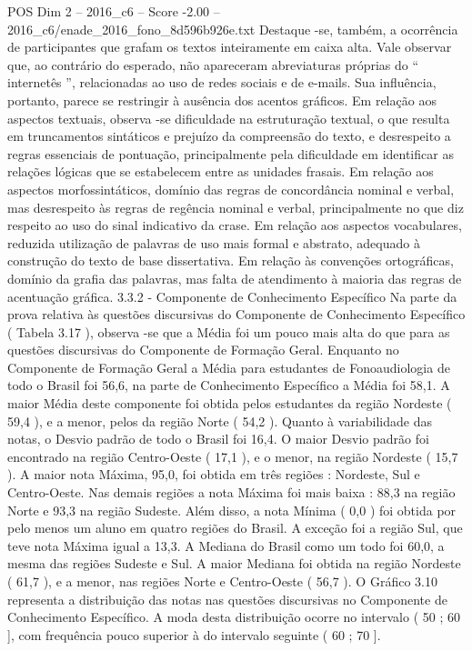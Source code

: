 \begin{textsample}{POS Dim 2 – 2016\_c6 – Score -2.00 – 2016\_c6/enade\_2016\_fono\_8d596b926e.txt}
Destaque -se, também, a ocorrência de participantes que grafam os textos inteiramente em caixa alta.
Vale observar que, ao contrário do esperado, não apareceram abreviaturas próprias do “ internetês ”, relacionadas ao uso de redes sociais e de e-mails.
Sua influência, portanto, parece se restringir à ausência dos acentos gráficos.
Em relação aos aspectos textuais, observa -se dificuldade na estruturação textual, o que resulta em truncamentos sintáticos e prejuízo da compreensão do texto, e desrespeito a regras essenciais de pontuação, principalmente pela dificuldade em identificar as relações lógicas que se estabelecem entre as unidades frasais.
Em relação aos aspectos morfossintáticos, domínio das regras de concordância nominal e verbal, mas desrespeito às regras de regência nominal e verbal, principalmente no que diz respeito ao uso do sinal indicativo da crase.
Em relação aos aspectos vocabulares, reduzida utilização de palavras de uso mais formal e abstrato, adequado à construção do texto de base dissertativa.
Em relação às convenções ortográficas, domínio da grafia das palavras, mas falta de atendimento à maioria das regras de acentuação gráfica. 3.3.2 - Componente de Conhecimento Específico Na parte da prova relativa às questões discursivas do Componente de Conhecimento Específico ( Tabela 3.17 ), observa -se que a Média foi um pouco mais alta do que para as questões discursivas do Componente de Formação Geral.
Enquanto no Componente de Formação Geral a Média para estudantes de Fonoaudiologia de todo o Brasil foi 56,6, na parte de Conhecimento Específico a Média foi 58,1.
A maior Média deste componente foi obtida pelos estudantes da região Nordeste ( 59,4 ), e a menor, pelos da região Norte ( 54,2 ).
Quanto à variabilidade das notas, o Desvio padrão de todo o Brasil foi 16,4.
O maior Desvio padrão foi encontrado na região Centro-Oeste ( 17,1 ), e o menor, na região Nordeste ( 15,7 ).
A maior nota Máxima, 95,0, foi obtida em três regiões : Nordeste, Sul e Centro-Oeste.
Nas demais regiões a nota Máxima foi mais baixa : 88,3 na região Norte e 93,3 na região Sudeste.
Além disso, a nota Mínima ( 0,0 ) foi obtida por pelo menos um aluno em quatro regiões do Brasil.
A exceção foi a região Sul, que teve nota Máxima igual a 13,3.
A Mediana do Brasil como um todo foi 60,0, a mesma das regiões Sudeste e Sul.
A maior Mediana foi obtida na região Nordeste ( 61,7 ), e a menor, nas regiões Norte e Centro-Oeste ( 56,7 ).
O Gráfico 3.10 representa a distribuição das notas nas questões discursivas no Componente de Conhecimento Específico.
A moda desta distribuição ocorre no intervalo ( 50 ; 60 ], com frequência pouco superior à do intervalo seguinte ( 60 ; 70 ].

\end{textsample}
